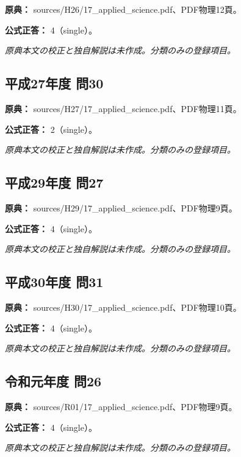 \noindent\textbf{原典：} sources/H26/17\_applied\_science.pdf、PDF物理12頁。

\textbf{公式正答：} 4（single）。

\par\textit{原典本文の校正と独自解説は未作成。分類のみの登録項目。}

\subsection{平成27年度 問30}
\label{q:h27-reg-applied-30}

\noindent\textbf{原典：} sources/H27/17\_applied\_science.pdf、PDF物理11頁。

\textbf{公式正答：} 2（single）。

\par\textit{原典本文の校正と独自解説は未作成。分類のみの登録項目。}

\subsection{平成29年度 問27}
\label{q:h29-reg-applied-27}

\noindent\textbf{原典：} sources/H29/17\_applied\_science.pdf、PDF物理9頁。

\textbf{公式正答：} 4（single）。

\par\textit{原典本文の校正と独自解説は未作成。分類のみの登録項目。}

\subsection{平成30年度 問31}
\label{q:h30-reg-applied-31}

\noindent\textbf{原典：} sources/H30/17\_applied\_science.pdf、PDF物理10頁。

\textbf{公式正答：} 4（single）。

\par\textit{原典本文の校正と独自解説は未作成。分類のみの登録項目。}

\subsection{令和元年度 問26}
\label{q:r01-reg-applied-26}

\noindent\textbf{原典：} sources/R01/17\_applied\_science.pdf、PDF物理9頁。

\textbf{公式正答：} 4（single）。

\par\textit{原典本文の校正と独自解説は未作成。分類のみの登録項目。}

